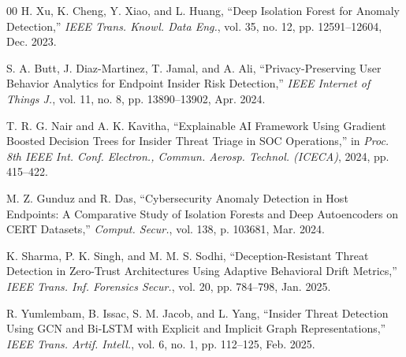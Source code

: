 \documentclass[conference]{IEEEtran}
\begin{document}
\begin{thebibliography}{00}
 H. Xu, K. Cheng, Y. Xiao, and L. Huang, ``Deep Isolation Forest for Anomaly Detection,'' \textit{IEEE Trans. Knowl. Data Eng.}, vol. 35, no. 12, pp. 12591--12604, Dec. 2023.

 S. A. Butt, J. Diaz-Martinez, T. Jamal, and A. Ali, ``Privacy-Preserving User Behavior Analytics for Endpoint Insider Risk Detection,'' \textit{IEEE Internet of Things J.}, vol. 11, no. 8, pp. 13890--13902, Apr. 2024.

 T. R. G. Nair and A. K. Kavitha, ``Explainable AI Framework Using Gradient Boosted Decision Trees for Insider Threat Triage in SOC Operations,'' in \textit{Proc. 8th IEEE Int. Conf. Electron., Commun. Aerosp. Technol. (ICECA)}, 2024, pp. 415--422.

 M. Z. Gunduz and R. Das, ``Cybersecurity Anomaly Detection in Host Endpoints: A Comparative Study of Isolation Forests and Deep Autoencoders on CERT Datasets,'' \textit{Comput. Secur.}, vol. 138, p. 103681, Mar. 2024.

 K. Sharma, P. K. Singh, and M. M. S. Sodhi, ``Deception-Resistant Threat Detection in Zero-Trust Architectures Using Adaptive Behavioral Drift Metrics,'' \textit{IEEE Trans. Inf. Forensics Secur.}, vol. 20, pp. 784--798, Jan. 2025.

 R. Yumlembam, B. Issac, S. M. Jacob, and L. Yang, ``Insider Threat Detection Using GCN and Bi-LSTM with Explicit and Implicit Graph Representations,'' \textit{IEEE Trans. Artif. Intell.}, vol. 6, no. 1, pp. 112--125, Feb. 2025.

\end{thebibliography}
\end{document}
